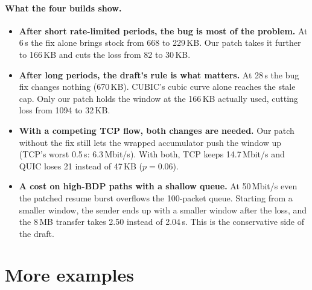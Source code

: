 \documentclass[11pt,a4paper]{article}
\begin{document}
\paragraph{What the four builds show.}
\begin{itemize}
  \item \textbf{After short rate-limited periods, the bug is most of the
        problem.} At 6\,s the fix alone brings stock from 668 to 229\,KB.
        Our patch takes it further to 166\,KB and cuts the loss from 82 to
        30\,KB.
  \item \textbf{After long periods, the draft's rule is what matters.} At
        28\,s the bug fix changes nothing (670\,KB). CUBIC's cubic curve
        alone reaches the stale cap. Only our patch holds the window at the
        166\,KB actually used, cutting loss from 1094 to 32\,KB.
  \item \textbf{With a competing TCP flow, both changes are needed.} Our
        patch without the fix still lets the wrapped accumulator push the
        window up (TCP's worst 0.5\,s: 6.3\,Mbit/s). With both, TCP keeps
        14.7\,Mbit/s and QUIC loses 21 instead of 47\,KB ($p = 0.06$).
  \item \textbf{A cost on high-BDP paths with a shallow queue.} At
        50\,Mbit/s even the patched resume burst overflows the 100-packet
        queue. Starting from a smaller window, the sender ends up with a
        smaller window after the loss, and the 8\,MB transfer takes 2.50
        instead of 2.04\,s. This is the conservative side of the draft.
\end{itemize}

\section{More examples}
\end{document}

